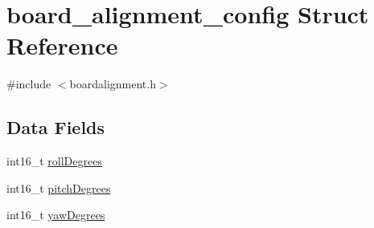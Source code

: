 \hypertarget{structboard__alignment__config}{\section{board\+\_\+alignment\+\_\+config Struct Reference}
\label{structboard__alignment__config}
}


{\ttfamily \#include $<$boardalignment.\+h$>$}

\subsection*{Data Fields}
\begin{DoxyCompactItemize}
\item 
int16\+\_\+t \hyperlink{structboard__alignment__config_a78e26c037b7145c91a4823ac790b8611}{roll\+Degrees}
\item 
int16\+\_\+t \hyperlink{structboard__alignment__config_ade4804024d1b829340dd2dc2633d4da6}{pitch\+Degrees}
\item 
int16\+\_\+t \hyperlink{structboard__alignment__config_aaea0b7deffaba0730f8fc3e4118dde40}{yaw\+Degrees}
\end{DoxyCompactItemize}


